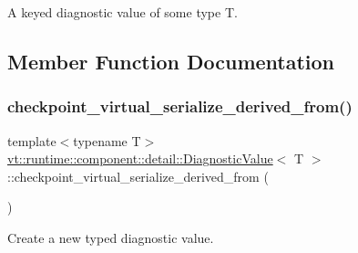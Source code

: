 A keyed diagnostic value of some type {\ttfamily T}. 

\subsection{Member Function Documentation}
\mbox{\label{structvt_1_1runtime_1_1component_1_1detail_1_1_diagnostic_value_a93e99556ebd3b6ec6a23d63dcd4cf81a}} 
\subsubsection{\texorpdfstring{checkpoint\+\_\+virtual\+\_\+serialize\+\_\+derived\+\_\+from()}{checkpoint\_virtual\_serialize\_derived\_from()}}
{\footnotesize\ttfamily template$<$typename T$>$ \\
\hyperlink{structvt_1_1runtime_1_1component_1_1detail_1_1_diagnostic_value}{vt\+::runtime\+::component\+::detail\+::\+Diagnostic\+Value}$<$ T $>$\+::checkpoint\+\_\+virtual\+\_\+serialize\+\_\+derived\+\_\+from (\begin{DoxyParamCaption}\item[{\hyperlink{structvt_1_1runtime_1_1component_1_1detail_1_1_diagnostic_base}{Diagnostic\+Base}}]{ }\end{DoxyParamCaption})\hspace{0.3cm}{\ttfamily [inline]}}



Create a new typed diagnostic value. 


